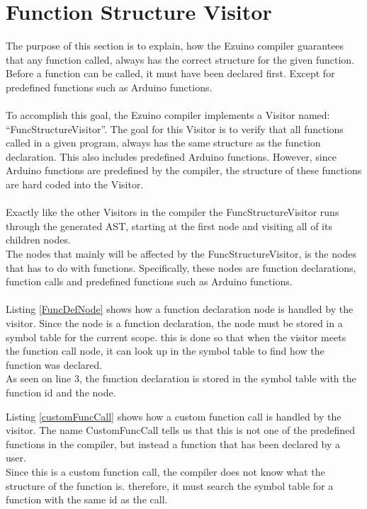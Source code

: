 \section{Function Structure Visitor}
The purpose of this section is to explain, how the Ezuino compiler guarantees that any function called, always has the correct structure for the given function. Before a function can be called, it must have been declared first. Except for predefined functions such as Arduino functions.
\\\\
To accomplish this goal, the Ezuino compiler implements a Visitor named: “FuncStructureVisitor”. The goal for this Visitor is to verify that all functions called in a given program, always has the same structure as the function declaration. This also includes predefined Arduino functions. However, since Arduino functions are predefined by the compiler, the structure of these functions are hard coded into the Visitor.
\\\\
Exactly like the other Visitors in the compiler the FuncStructureVisitor runs through the generated AST, starting at the first node and visiting all of its children nodes.\\
The nodes that mainly will be affected by the FuncStructureVisitor, is the nodes that has to do with functions. Specifically, these nodes are function declarations, function calls and predefined functions such as Arduino functions.
\\\\
Listing \ref{FuncDefNode} shows how a function declaration node is handled by the visitor. Since the node is a function declaration, the node must be stored in a symbol table for the current scope. this is done so that when the visitor meets the function call node, it can look up in the symbol table to find how the function was declared.\\
As seen on line 3, the function declaration is stored in the symbol table with the function id and the node.

\noindent\newline
Listing \ref{customFuncCall} shows how a custom function call is handled by the visitor. The name CustomFuncCall tells us that this is not one of the predefined functions in the compiler, but instead a function that has been declared by a user.\\
Since this is a custom function call, the compiler does not know what the structure of the function is. therefore, it must search the symbol table for a function with the same id as the call.\\

